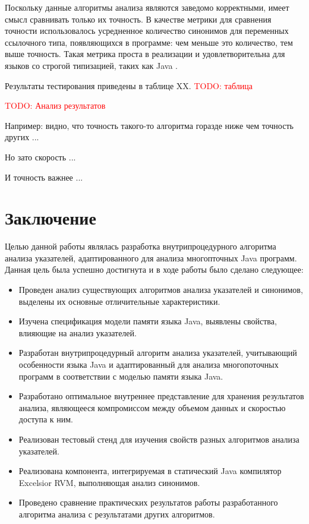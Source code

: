 \documentclass[14pt,titlepage]{extarticle}
\newcommand{\todo}[1]{\textcolor{red}{\eng{TODO}: #1}}
\newcommand{\eng}[1]{{\English#1}}
\let\oldsection\section
\renewcommand{\section}{\newpage\oldsection}
\newcommand{\sectionwithoutnumber}[1]{
  \section*{#1}
  \addcontentsline{toc}{section}{#1}
}
\begin{document}
    Поскольку данные алгоритмы анализа являются заведомо корректными, имеет
    смысл сравнивать только их точность. В качестве метрики для сравнения
    точности использовалось усредненное количество синонимов для переменных
    ссылочного типа, появляющихся в программе: чем меньше это количество, тем
    выше точность. Такая метрика проста в реализации и удовлетворительна для
    языков со строгой типизацией, таких как Java
    \cite{hind_pointer_analysis_not_solved_yet}.

    Результаты тестирования приведены в таблице XX.
    \todo{таблица}

    \todo{Анализ результатов}

    Например: видно, что точность такого-то алгоритма горазде ниже чем точность
    других ...

    Но зато скорость ...

    И точность важнее ...

  \sectionwithoutnumber{Заключение}

    Целью данной работы являлась разработка внутрипроцедурного алгоритма
    анализа указателей, адаптированного для анализа многопточных Java программ.
    Данная цель была успешно достигнута и в ходе работы было сделано следующее:
    \begin{itemize}
      \item Проведен анализ существующих алгоритмов анализа указателей и
            синонимов, выделены их основные отличительные характеристики.
      \item Изучена спецификация модели памяти языка Java, выявлены свойства,
            влияющие на анализ указателей.
      \item Разработан внутрипроцедурный алгоритм анализа указателей,
            учитывающий особенности языка Java и адаптированный для анализа
            многопоточных программ в соответствии с моделью памяти языка Java.
      \item Разработано оптимальное внутреннее представление для хранения
            результатов анализа, являющееся компромиссом между объемом данных
            и скоростью доступа к ним.
      \item Реализован тестовый стенд для изучения свойств разных алгоритмов
            анализа указателей.
      \item Реализована компонента, интегрируемая в статический Java компилятор
            Excelsior RVM, выполняющая анализ синонимов.
      \item Проведено сравнение практических результатов работы разработанного
            алгоритма анализа с результатами других алгоритмов.
    \end{itemize}
\end{document}
